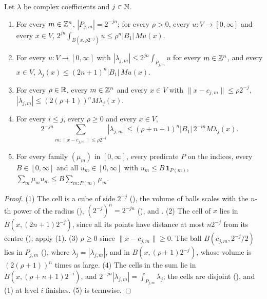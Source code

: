 \begin{lemma}
\label{lem:coefficients-maximal}
\leanok
{}
Let $\lambda$ be complex coefficients and $j \in \mathbb{N}$.
\begin{enumerate}
  \item For every $m \in \mathbb{Z}^n$, $|P_{j,m}| = 2^{-jn}$; for every $\rho > 0$, every
    $u : V \to [0, \infty]$ and every $x \in V$,
    $2^{jn} \int_{B(x, \rho 2^{-j})} u \leq \rho^n |B_1| \, M u(x)$.
  \item For every $u : V \to [0, \infty]$ with $|\lambda_{j,m}| \leq 2^{jn} \int_{P_{j,m}} u$
    for every $m \in \mathbb{Z}^n$, and every $x \in V$,
    $\lambda_j(x) \leq (2n + 1)^n |B_1| \, M u(x)$.
  \item For every $\rho \in \mathbb{R}$, every $m \in \mathbb{Z}^n$ and every $x \in V$ with
    $\|x - c_{j,m}\| \leq \rho 2^{-j}$, $|\lambda_{j,m}| \leq (2(\rho + 1))^n M \lambda_j(x)$.
  \item For every $i \leq j$, every $\rho \geq 0$ and every $x \in V$,
    \[
      2^{-jn} \sum_{m : \|x - c_{j,m}\| \leq \rho 2^{-i}} |\lambda_{j,m}| \leq
      (\rho + n + 1)^n |B_1| \, 2^{-in} M \lambda_j(x) .
    \]
  \item For every family $(\mu_m)$ in $[0, \infty]$, every predicate $P$ on the indices, every
    $B \in [0, \infty]$ and all $u_m \in [0, \infty]$ with $u_m \leq B \, \mathbf 1_{P(m)}$,
    $\sum_m \mu_m u_m \leq B \sum_{m : P(m)} \mu_m$.
\end{enumerate}
\end{lemma}

\begin{proof}
\leanok
(1) The cell is a cube of side $2^{-j}$ (), the volume of balls scales
with the $n$-th power of the radius (),
$(2^{-j})^n = 2^{-jn}$ (), and
. (2) The cell of $x$ lies in
$B(x, (2n + 1) 2^{-j})$, since all its points have distance at most $n 2^{-j}$ from its centre
(); apply (1). (3) $\rho \geq 0$ since $\|x - c_{j,m}\| \geq 0$. The ball
$B(c_{j,m}, 2^{-j}/2)$ lies in $P_{j,m}$
(), where $\lambda_j = |\lambda_{j,m}|$, and in
$B(x, (\rho + 1) 2^{-j})$, whose volume is $(2(\rho + 1))^n$ times as large. (4) The cells in the
sum lie in $B(x, (\rho + n + 1) 2^{-i})$, and $2^{-jn} |\lambda_{j,m}| = \int_{P_{j,m}} \lambda_j$;
the cells are disjoint (), and (1) at level $i$ finishes. (5) is
termwise.
\end{proof}

